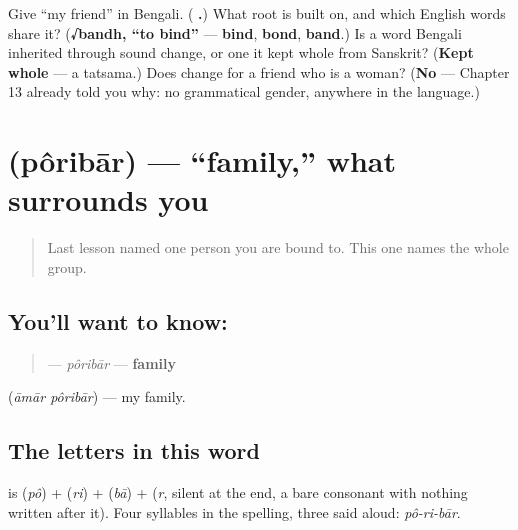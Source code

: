 \begin{tcolorbox}[breakable,colback=teal!4,colframe=teal!35!black,title={Before you move on}]
Give \textquotedblleft{}my friend\textquotedblright{} in Bengali. (\textbf{ .}) What root is  built on, and which English words share it? (\textbf{√bandh, \textquotedblleft{}to bind\textquotedblright{}} — \textbf{bind}, \textbf{bond}, \textbf{band}.) Is  a word Bengali inherited through sound change, or one it kept whole from Sanskrit? (\textbf{Kept whole} — a tatsama.) Does  change for a friend who is a woman? (\textbf{No} — Chapter 13 already told you why: no grammatical gender, anywhere in the language.)
\end{tcolorbox}
\section[\texorpdfstring{\bn{পরিবার} (pôribār)}{পরিবার (pôribār)}]{ (pôribār) — \textquotedblleft{}family,\textquotedblright{} what surrounds you}

\label{lesson:BN-C11-poribar}



\begin{quote}
Last lesson named one person you are bound to. This one names the whole group.
\end{quote}

\subsection*{You'll want to know: }
\begin{quote}
\textbf{} — \emph{pôribār} — \textbf{family}
\end{quote}

\textbf{ } (\emph{āmār pôribār}) — my family.

\subsection*{The letters in this word}
\textbf{} is \textbf{} (\emph{pô}) + \textbf{} (\emph{ri}) +  (\emph{bā}) + \textbf{} (\emph{r}, silent at the end, a bare consonant with nothing written after it). Four syllables in the spelling, three said aloud: \emph{pô-ri-bār}.

